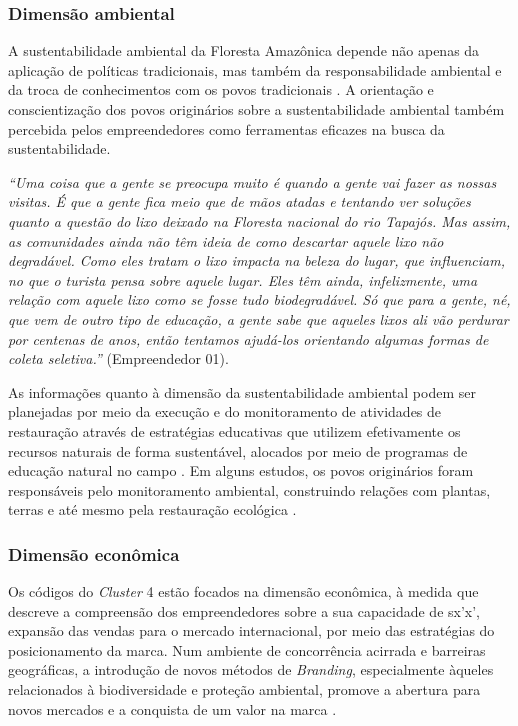 \subsubsection*{Dimensão ambiental}

A sustentabilidade ambiental da Floresta Amazônica depende não apenas da aplicação de políticas tradicionais, mas também da responsabilidade ambiental e da troca de conhecimentos com os povos tradicionais  \cite{Postel2006LaFordiste}. A orientação e conscientização dos povos originários sobre a sustentabilidade ambiental também percebida pelos empreendedores como ferramentas eficazes na busca da sustentabilidade.

\textit{“Uma coisa que a gente se preocupa muito é quando a gente vai fazer as nossas visitas. É que a gente fica meio que de mãos atadas e tentando ver soluções quanto a questão do lixo deixado na Floresta nacional do rio Tapajós. Mas assim, as comunidades ainda não têm ideia de como descartar aquele lixo não degradável. Como eles tratam o lixo impacta na beleza do lugar, que influenciam, no que o turista pensa sobre aquele lugar. Eles têm ainda, infelizmente, uma relação com aquele lixo como se fosse tudo biodegradável. Só que para a gente, né, que vem de outro tipo de educação, a gente sabe que aqueles lixos ali vão perdurar por centenas de anos, então tentamos ajudá-los orientando algumas formas de coleta seletiva.”} (Empreendedor 01).

As informações quanto à dimensão da sustentabilidade ambiental podem ser planejadas por meio da execução e do monitoramento de atividades de restauração através de estratégias educativas que utilizem efetivamente os recursos naturais de forma sustentável, alocados por meio de programas de educação natural no campo \cite{Reyes-Garcia2019TheRestoration}. Em alguns estudos, os povos originários foram responsáveis pelo monitoramento ambiental, construindo relações com plantas, terras e até mesmo pela restauração ecológica \cite{Wehi2017ImportanceRestoration,Thompson2020AMonitoring}. 

\subsubsection*{Dimensão econômica}

Os códigos do \textit{Cluster} 4 estão focados na dimensão econômica, à medida que descreve a compreensão dos empreendedores sobre a sua capacidade de sx'x', expansão das vendas para o mercado internacional, por meio das estratégias do posicionamento da marca. Num ambiente de concorrência acirrada e barreiras geográficas, a introdução de novos métodos de \textit{Branding}, especialmente àqueles relacionados à biodiversidade e proteção ambiental, promove a abertura para novos mercados e a conquista de um valor na marca \cite{Gupta2016EnhancingRecycling}.

